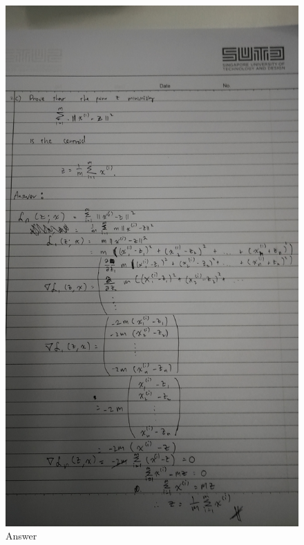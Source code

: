 \documentclass[11pt]{article}
\makeatletter
\def\maxwidth{\ifdim\Gin@nat@width>\linewidth\linewidth
    \else\Gin@nat@width\fi}
\let\Oldincludegraphics\includegraphics
\renewcommand{\includegraphics}[1]{\Oldincludegraphics[width=.8\maxwidth]{#1}}
\makeatother
\begin{document}
\begin{figure}[htbp]
\centering
\includegraphics{prove.jpg}
\caption{Answer}
\end{figure}


    
    
    
    
\end{document}
